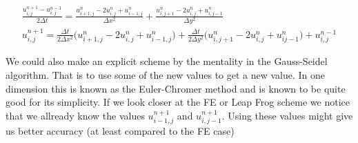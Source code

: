 \documentclass[a4paper,english, 10pt, twoside]{article}
\begin{document}
\begin{align*}
 \frac{u^{n+1}_{i,j}-u^{n-1}_{i,j}}{2\Delta t} = \frac{u^n_{i+1,j}-2u^n_{i,j} + u^n_{i-1,j}}{\Delta x^2}+ 
 \frac{u^n_{i,j+1}-2u^n_{i,j} + u^n_{i,j-1}}{\Delta y^2}\\
  u^{n+1}_{i,j} = \frac{\Delta t}{2\Delta x^2}\big(u^n_{i+1,j}-2u^n_{i,j} + u^n_{i-1,j}\big) + 
 \frac{\Delta t}{2\Delta y^2}\big(u^n_{i,j+1}-2u^n_{i,j} + u^n_{ij-1}\big) + u^{n-1}_{i,j}
\end{align*}

We could also make an explicit scheme by the mentality in the Gauss-Seidel algorithm. That is to use some of the new values to get 
a new value. In one dimension this is known as the Euler-Chromer method and is known to be quite good for its simplicity. If we 
look closer at the FE or Leap Frog scheme we notice that we allready know the values $u^{n+1}_{i-1,j}$ and $u^{n+1}_{i,j-1}$. 
Using these values might give us better accuracy (at least compared to the FE case)
\end{document}
